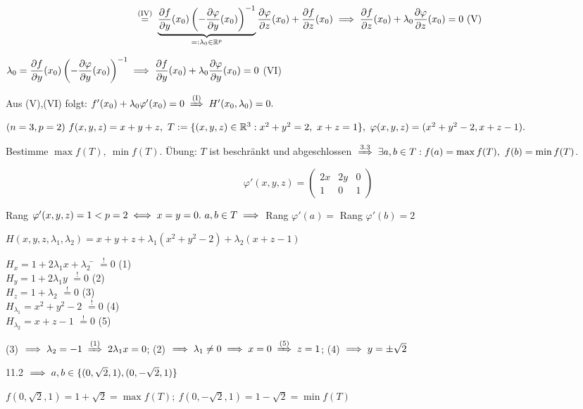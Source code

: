 \documentclass[a4paper,twoside,DIV15,BCOR12mm,chapterprefix=true,headings=twolinechapter]{scrbook}
\begin{document}
\begin{beweis}
$$\gleichnach{(IV)} \underbrace{\frac{\partial f}{\partial y}(x_0) \left(-\frac{\partial \varphi}{\partial y}(x_0)\right)^{-1}}_{=: \lambda_0 \in \MdR^p} \frac{\partial \varphi}{\partial z}(x_0) + \frac{\partial f}{\partial z}(x_0) \folgt \frac{\partial f}{\partial z}(x_0) + \lambda_0 \frac{\partial \varphi}{\partial z}(x_0) = 0\text{ (V)}$$

$\displaystyle{\lambda_0 = \frac{\partial f}{\partial y}(x_0) \left(-\frac{\partial \varphi}{\partial y}(x_0)\right)^{-1} \ensuremath{\implies}\frac{\partial f}{\partial y}(x_0) + \lambda_0 \frac{\partial \varphi}{\partial y}(x_0) = 0}$ (VI)

Aus (V),(VI) folgt: $f'(x_0) + \lambda_0\varphi'(x_0) = 0 \folgtnach{(I)} H'(x_0,\lambda_0) = 0.$

\end{beweis}

\begin{beispiel}
$(n=3,p=2)\ f(x,y,z) = x+y+z,\ T:=\{(x,y,z) \in \mathbb{R}^3: x^2+y^2=2,\ x+z=1\},\ \varphi(x,y,z) = (x^2+y^2-2,x+z-1).$

Bestimme $\max f(T),\ \min f(T)$. Übung: $T$ ist beschränkt und abgeschlossen $\folgtnach{3.3} \exists a,b \in T: f(a) = \max f(T),\ f(b) = \min f(T)$.

$$\varphi'(x,y,z) = \left(\begin{array}{ccc}
2x & 2y & 0\\
1  & 0  & 1
\end{array}\right)$$

Rang $\varphi'(x,y,z) = 1 < p=2 \iff x=y=0.\ a,b\in T \implies$ Rang $\varphi'(a) =$ Rang $\varphi'(b) = 2$

\def\shouldbe{\overset{!}{=}}

$H(x,y,z,\lambda_1,\lambda_2) = x+y+z+\lambda_1(x^2+y^2-2) + \lambda_2(x+z-1)$\\
\begin{tabbing}
$H_x=1+2\lambda_1x+\lambda_2$ \= $\shouldbe 0$ (1)\\
$H_y=1+2\lambda_1y          $ \> $\shouldbe 0$ (2)\\
$H_z=1+\lambda_2            $ \> $\shouldbe 0$ (3)\\
$H_{\lambda_1}=x^2+y^2-2    $ \> $\shouldbe 0$ (4)\\
$H_{\lambda_2}=x+z-1        $ \> $\shouldbe 0$ (5)
\end{tabbing}

(3) $\folgt \lambda_2=-1 \folgtnach{(1)} 2\lambda_1x=0$; (2) $\folgt \lambda_1\ne0 \folgt x=0 \folgtnach{(5)} z=1$; (4) $\implies y = \pm \sqrt{2}$

11.2 $\implies a,b \in \{(0,\sqrt{2},1),(0,-\sqrt{2},1)\}$

$f(0,\sqrt{2},1) = 1+\sqrt{2} = \max f(T);\ f(0,-\sqrt{2},1) = 1-\sqrt{2} = \min f(T)$

\end{beispiel}
\end{document}
